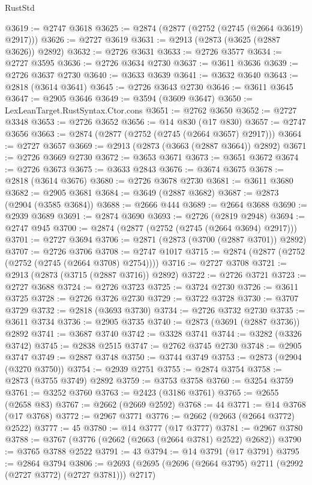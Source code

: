 \begin{lexlean}{RustStd}
\begin{coremodule}
@3619 := @2747 @3618
@3625 := @2874 (@2877 (@2752 (@2745 (@2664 @3619) @2917)))
@3626 := @2727 @3619
@3631 := @2913 (@2873 (@3625 (@2887 @3626)) @2892)
@3632 := @2726 @3631
@3633 := @2726 @3577
@3634 := @2727 @3595
@3636 := @2726 @3634 @2730
@3637 := @3611 @3636
@3639 := @2726 @3637 @2730
@3640 := @3633 @3639
@3641 := @3632 @3640
@3643 := @2818 (@3614 @3641)
@3645 := @2726 @3643 @2730
@3646 := @3611 @3645
@3647 := @2905 @3646
@3649 := @3594 (@3609 @3647)
@3650 := LexLeanTarget.RustSyntax.Ctor.cons
@3651 := @2762 @3650
@3652 := @2727 @3348
@3653 := @2726 @3652
@3656 := @14 @830 (@17 @830)
@3657 := @2747 @3656
@3663 := @2874 (@2877 (@2752 (@2745 (@2664 @3657) @2917)))
@3664 := @2727 @3657
@3669 := @2913 (@2873 (@3663 (@2887 @3664)) @2892)
@3671 := @2726 @3669 @2730
@3672 := @3653 @3671
@3673 := @3651 @3672
@3674 := @2726 @3673
@3675 := @3633 @2843
@3676 := @3674 @3675
@3678 := @2818 (@3614 @3676)
@3680 := @2726 @3678 @2730
@3681 := @3611 @3680
@3682 := @2905 @3681
@3684 := @3649 (@2887 @3682)
@3687 := @2873 (@2904 (@3585 @3684))
@3688 := @2666 @444
@3689 := @2664 @3688
@3690 := @2939 @3689
@3691 := @2874 @3690
@3693 := @2726 (@2819 @2948)
@3694 := @2747 @945
@3700 := @2874 (@2877 (@2752 (@2745 (@2664 @3694) @2917)))
@3701 := @2727 @3694
@3706 := @2871 (@2873 (@3700 (@2887 @3701)) @2892)
@3707 := @2726 @3706
@3708 := @2747 @1017
@3715 := @2874 (@2877 (@2752 (@2752 (@2745 (@2664 @3708) @2754))))
@3716 := @2727 @3708
@3721 := @2913 (@2873 (@3715 (@2887 @3716)) @2892)
@3722 := @2726 @3721
@3723 := @2727 @3688
@3724 := @2726 @3723
@3725 := @3724 @2730
@3726 := @3611 @3725
@3728 := @2726 @3726 @2730
@3729 := @3722 @3728
@3730 := @3707 @3729
@3732 := @2818 (@3693 @3730)
@3734 := @2726 @3732 @2730
@3735 := @3611 @3734
@3736 := @2905 @3735
@3740 := @2873 (@3691 (@2887 @3736)) @2892
@3741 := @3687 @3740
@3742 := @3328 @3741
@3744 := @3282 (@3326 @3742)
@3745 := @2838 @2515
@3747 := @2762 @3745 @2730
@3748 := @2905 @3747
@3749 := @2887 @3748
@3750 := @3744 @3749
@3753 := @2873 (@2904 (@3270 @3750))
@3754 := @2939 @2751
@3755 := @2874 @3754
@3758 := @2873 (@3755 @3749) @2892
@3759 := @3753 @3758
@3760 := @3254 @3759
@3761 := @3252 @3760
@3763 := @2423 (@3186 @3761)
@3765 := @2655 (@2658 @83)
@3767 := @2662 (@2669 @2592)
@3768 := 44
@3771 := @14 @3768 (@17 @3768)
@3772 := @2967 @3771
@3776 := @2662 (@2663 (@2664 @3772) @2522)
@3777 := 45
@3780 := @14 @3777 (@17 @3777)
@3781 := @2967 @3780
@3788 := @3767 (@3776 (@2662 (@2663 (@2664 @3781) @2522) @2682))
@3790 := @3765 @3788 @2522
@3791 := 43
@3794 := @14 @3791 (@17 @3791)
@3795 := @2864 @3794
@3806 := @2693 (@2695 (@2696 (@2664 @3795) @2711 (@2992 (@2727 @3772) (@2727 @3781))) @2717)

\end{coremodule}
\end{lexlean}
